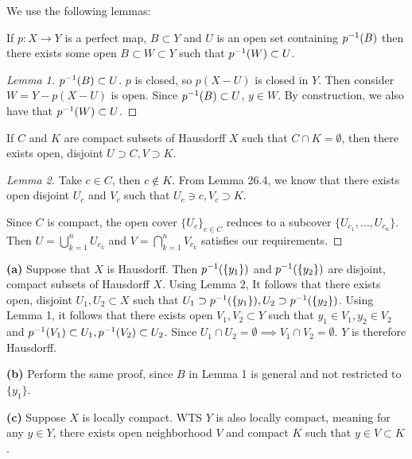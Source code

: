 \documentclass[a4paper, 10pt]{article}
\begin{document}
\begin{solution}
    We use the following lemmas:
    \begin{psetlemma} [Lemma 1]
    If $p: X \to Y$ is a perfect map, $B \subset Y$ and $U$ is an open set containing ${p}^{-1}(B)$ then there exists some open $B \subset W \subset Y$ such that ${p}^{-1}(W) \subset U$.
    \end{psetlemma}

    \begin{proof} [Lemma 1]
            ${p}^{-1}(B) \subset U$. $p$ is closed, so $p(X - U)$ is closed in $Y$. Then consider $W = Y - p(X - U)$ is open. Since ${p}^{-1}(B) \subset U$, $y \in W$. By construction, we also have that ${p}^{-1}(W) \subset U$.
    \end{proof}

    \begin{psetlemma} [Lemma 2]
        If $C$ and $K$ are compact subsets of Hausdorff $X$ such that $C \cap K = \emptyset$, then there exists open, disjoint $U \supset C, V \supset K$.
    \end{psetlemma}

    \begin{proof} [Lemma 2]
        Take $c \in C$, then $c \not \in K$. From Lemma 26.4, we know that there exists open disjoint $U_c$ and $V_c$ such that $U_c \ni c, V_c \supset K$.

        Since $C$ is compact, the open cover $\{U_c\}_{c \in C}$ reduces to a subcover $\{U_{c_1}, \ldots, U_{c_n}\}$. Then $U = \bigcup_{k = 1}^{n} U_{c_k}$ and $V = \bigcap_{k=1}^{n} V_{c_k}$ satisfies our requirements.
    \end{proof}

    \textbf{(a)} Suppose that $X$ is Hausdorff. Then ${p}^{-1}(\{y_1\})$ and $ {p}^{-1}(\{y_2\})$ are disjoint, compact subsets of Hausdorff $X$. Using Lemma 2, It follows that there exists open, disjoint $U_1, U_2 \subset X$ such that $U_1 \supset {p}^{-1}(\{y_1\}), U_2 \supset {p}^{-1}(\{y_2\})$. Using Lemma 1, it follows that there exists open $V_1, V_2 \subset Y$ such that $y_1 \in V_1, y_2 \in V_2$ and ${p}^{-1}(V_1) \subset U_1, {p}^{-1}(V_2) \subset U_2$. Since $U_1 \cap U_2 = \emptyset \implies V_1 \cap V_2 = \emptyset$. $Y$ is therefore Hausdorff.

    \textbf{(b)} Perform the same proof, since $B$ in Lemma 1 is general and not restricted to $\{y_1\}$.

    \textbf{(c)} Suppose $X$ is locally compact. WTS $Y$ is also locally compact, meaning for any $y \in Y$, there exists open neighborhood $V$ and compact $K$ such that $y \in V \subset K$.


\end{solution}
\end{document}
